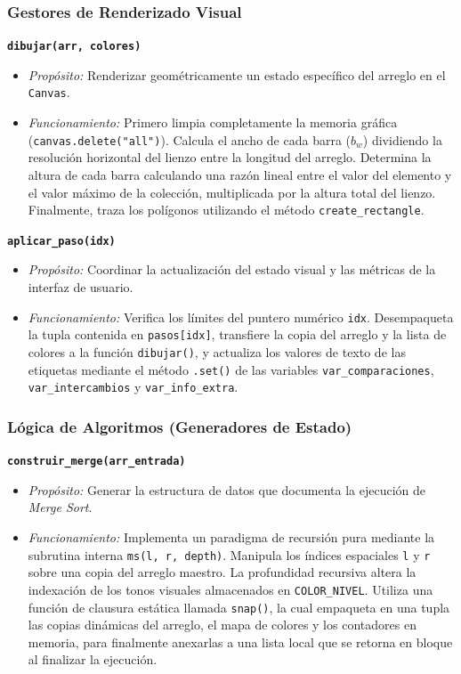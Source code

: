 \documentclass[conference]{IEEEtran}
\begin{document}
\subsubsection{Gestores de Renderizado Visual}
\vspace{0.2cm}
\noindent \textbf{\texttt{dibujar(arr, colores)}}
\begin{itemize}
    \item \textit{Propósito:} Renderizar geométricamente un estado específico del arreglo en el \texttt{Canvas}.
    \item \textit{Funcionamiento:} Primero limpia completamente la memoria gráfica (\texttt{canvas.delete("all")}). Calcula el ancho de cada barra ($b_w$) dividiendo la resolución horizontal del lienzo entre la longitud del arreglo. Determina la altura de cada barra calculando una razón lineal entre el valor del elemento y el valor máximo de la colección, multiplicada por la altura total del lienzo. Finalmente, traza los polígonos utilizando el método \texttt{create\_rectangle}.
\end{itemize}

\vspace{0.2cm}
\noindent \textbf{\texttt{aplicar\_paso(idx)}}
\begin{itemize}
    \item \textit{Propósito:} Coordinar la actualización del estado visual y las métricas de la interfaz de usuario.
    \item \textit{Funcionamiento:} Verifica los límites del puntero numérico \texttt{idx}. Desempaqueta la tupla contenida en \texttt{pasos[idx]}, transfiere la copia del arreglo y la lista de colores a la función \texttt{dibujar()}, y actualiza los valores de texto de las etiquetas mediante el método \texttt{.set()} de las variables \texttt{var\_comparaciones}, \texttt{var\_intercambios} y \texttt{var\_info\_extra}.
\end{itemize}

\subsubsection{Lógica de Algoritmos (Generadores de Estado)}
\vspace{0.2cm}
\noindent \textbf{\texttt{construir\_merge(arr\_entrada)}}
\begin{itemize}
    \item \textit{Propósito:} Generar la estructura de datos que documenta la ejecución de \textit{Merge Sort}.
    \item \textit{Funcionamiento:} Implementa un paradigma de recursión pura mediante la subrutina interna \texttt{ms(l, r, depth)}. Manipula los índices espaciales \texttt{l} y \texttt{r} sobre una copia del arreglo maestro. La profundidad recursiva altera la indexación de los tonos visuales almacenados en \texttt{COLOR\_NIVEL}. Utiliza una función de clausura estática llamada \texttt{snap()}, la cual empaqueta en una tupla las copias dinámicas del arreglo, el mapa de colores y los contadores en memoria, para finalmente anexarlas a una lista local que se retorna en bloque al finalizar la ejecución.
\end{itemize}
\end{document}
